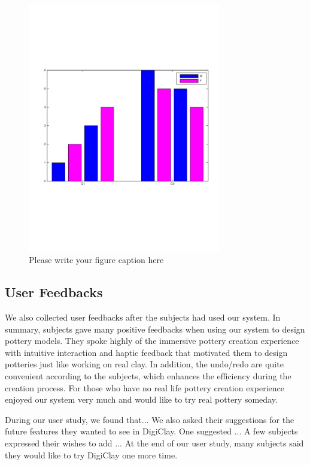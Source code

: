 \begin{figure}
  \includegraphics[width=0.75\textwidth]{f9.pdf}
\caption{Please write your figure caption here}
\label{fig:1}       %
\end{figure}

\subsection{User Feedbacks}
\label{sec:6.5}

We also collected user feedbacks after the subjects had used our system. In summary, subjects gave many positive feedbacks when using our system to design pottery models. They spoke highly of the immersive pottery creation experience with intuitive interaction and haptic feedback that motivated them to design potteries just like working on real clay. In addition, the undo/redo are quite convenient according to the subjects, which enhances the efficiency during the creation process. For those who have no real life pottery creation experience enjoyed our system very much and would like to try real pottery someday. 

During our user study, we found that...
We also asked their suggestions for the future features they wanted to see in DigiClay.
One suggested ...
A few subjects expressed their wishes to add ...
At the end of our user study, many subjects said they would like to try DigiClay one more time.

